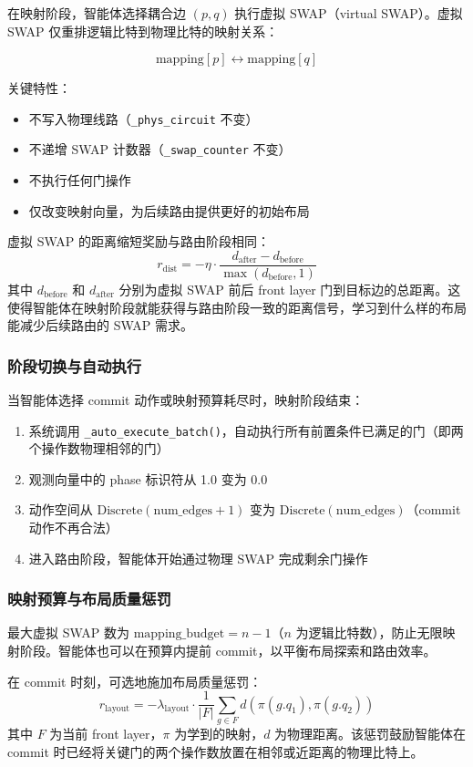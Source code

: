 在映射阶段，智能体选择耦合边 $(p, q)$ 执行虚拟 SWAP（virtual SWAP）。虚拟 SWAP 仅重排逻辑比特到物理比特的映射关系：

\[
\text{mapping}[p] \leftrightarrow \text{mapping}[q]
\]

关键特性：
\begin{itemize}
  \item 不写入物理线路（\texttt{\_phys\_circuit} 不变）
  \item 不递增 SWAP 计数器（\texttt{\_swap\_counter} 不变）
  \item 不执行任何门操作
  \item 仅改变映射向量，为后续路由提供更好的初始布局
\end{itemize}

虚拟 SWAP 的距离缩短奖励与路由阶段相同：
\[
r_{\text{dist}} = -\eta \cdot \frac{d_{\text{after}} - d_{\text{before}}}{\max(d_{\text{before}}, 1)}
\]
其中 $d_{\text{before}}$ 和 $d_{\text{after}}$ 分别为虚拟 SWAP 前后 front layer 门到目标边的总距离。这使得智能体在映射阶段就能获得与路由阶段一致的距离信号，学习到什么样的布局能减少后续路由的 SWAP 需求。

\subsubsection{阶段切换与自动执行}

当智能体选择 commit 动作或映射预算耗尽时，映射阶段结束：
\begin{enumerate}
  \item 系统调用 \texttt{\_auto\_execute\_batch()}，自动执行所有前置条件已满足的门（即两个操作数物理相邻的门）
  \item 观测向量中的 phase 标识符从 1.0 变为 0.0
  \item 动作空间从 $\text{Discrete}(\text{num\_edges} + 1)$ 变为 $\text{Discrete}(\text{num\_edges})$（commit 动作不再合法）
  \item 进入路由阶段，智能体开始通过物理 SWAP 完成剩余门操作
\end{enumerate}

\subsubsection{映射预算与布局质量惩罚}

最大虚拟 SWAP 数为 $\text{mapping\_budget} = n - 1$（$n$ 为逻辑比特数），防止无限映射阶段。智能体也可以在预算内提前 commit，以平衡布局探索和路由效率。

在 commit 时刻，可选地施加布局质量惩罚：
\[
r_{\text{layout}} = -\lambda_{\text{layout}} \cdot \frac{1}{|F|} \sum_{g \in F} d(\pi(g.q_1), \pi(g.q_2))
\]
其中 $F$ 为当前 front layer，$\pi$ 为学到的映射，$d$ 为物理距离。该惩罚鼓励智能体在 commit 时已经将关键门的两个操作数放置在相邻或近距离的物理比特上。

